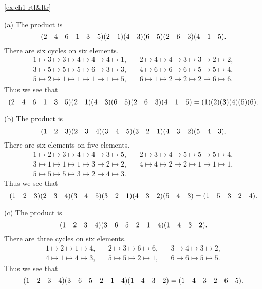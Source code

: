 \begin{solution}{\ref{ex:ch1-rtl&ltr}}
{    (a) The product is
    \[
    (2 \quad 4 \quad 6 \quad 1 \quad 3 \quad 5)(2 \quad 1)(4 \quad 3)(6 \quad 5)(2 \quad 6 \quad 3)(4 \quad 1 \quad 5).
    \]
    There are six cycles on six elements.
    \[
    \begin{array}{c}
        1 \mapsto 3 \mapsto 3 \mapsto 4 \mapsto 4 \mapsto 4 \mapsto 1, \hspace{20pt}
        2 \mapsto 4 \mapsto 4 \mapsto 3 \mapsto 3 \mapsto 2 \mapsto 2,\\
        3 \mapsto 5 \mapsto 5 \mapsto 5 \mapsto 6 \mapsto 3 \mapsto 3, \hspace{20pt}
        4 \mapsto 6 \mapsto 6 \mapsto 6 \mapsto 5 \mapsto 5 \mapsto 4,\\
        5 \mapsto 2 \mapsto 1 \mapsto 1 \mapsto 1 \mapsto 1 \mapsto 5,\hspace{20pt}
        6 \mapsto 1 \mapsto 2 \mapsto 2 \mapsto 2 \mapsto 6 \mapsto 6.
    \end{array}
    \]
    Thus we see that
    \[
    (2 \quad 4 \quad 6 \quad 1 \quad 3 \quad 5)(2 \quad 1)(4 \quad 3)(6 \quad 5)(2 \quad 6 \quad 3)(4 \quad 1 \quad 5) = (1)(2)(3)(4)(5)(6).
    \]

    (b) The product is
    \[
    (1 \quad 2 \quad 3)(2 \quad 3 \quad 4)(3 \quad 4 \quad 5)(3 \quad 2 \quad 1)(4 \quad 3 \quad 2)(5 \quad 4 \quad 3).
    \]
    There are six elements on five elements.
    \[
    \begin{array}{c}
        1 \mapsto 2 \mapsto 3 \mapsto 4 \mapsto 4 \mapsto 3 \mapsto 5, \hspace{20pt}
        2 \mapsto 3 \mapsto 4 \mapsto 5 \mapsto 5 \mapsto 5 \mapsto 4,\\
        3 \mapsto 1 \mapsto 1 \mapsto 1 \mapsto 3 \mapsto 2 \mapsto 2, \hspace{20pt}
        4 \mapsto 4 \mapsto 2 \mapsto 2 \mapsto 1 \mapsto 1 \mapsto 1,\\
        5 \mapsto 5 \mapsto 5 \mapsto 3 \mapsto 2 \mapsto 4 \mapsto 3.
    \end{array}
    \]
    Thus we see that
    \[
    (1 \quad 2 \quad 3)(2 \quad 3 \quad 4)(3 \quad 4 \quad 5)(3 \quad 2 \quad 1)(4 \quad 3 \quad 2)(5 \quad 4 \quad 3) = (1 \quad 5 \quad 3 \quad 2 \quad 4).
    \]

    (c) The product is
    \[
    (1 \quad 2 \quad 3 \quad 4)(3 \quad 6 \quad 5 \quad 2 \quad 1 \quad 4)(1 \quad 4 \quad 3 \quad 2).
    \]
    There are three cycles on six elements.
    \[
    \begin{array}{c}
        1 \mapsto 2 \mapsto 1 \mapsto 4, \hspace{20pt} 2 \mapsto 3 \mapsto 6 \mapsto 6, \hspace{20pt} 3 \mapsto 4 \mapsto 3 \mapsto 2,\\
        4 \mapsto 1 \mapsto 4 \mapsto 3, \hspace{20pt} 5 \mapsto 5 \mapsto 2 \mapsto 1, \hspace{20pt} 6 \mapsto 6 \mapsto 5 \mapsto 5.
    \end{array}
    \]
    Thus we see that
    \[
    (1 \quad 2 \quad 3 \quad 4)(3 \quad 6 \quad 5 \quad 2 \quad 1 \quad 4)(1 \quad 4 \quad 3 \quad 2) = (1 \quad 4 \quad 3 \quad 2 \quad 6 \quad 5).
    \]

}
\end{solution}
